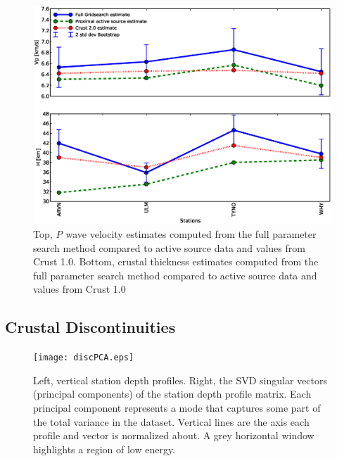 \documentclass[review]{elsarticle}
\begin{document}
\begin{figure}
  \centering
  \includegraphics[width=\textwidth]{vpactive.eps}
  \caption{Top, {\it P} wave velocity estimates computed from the full parameter search method compared to active source data and values from Crust 1.0. Bottom, crustal thickness estimates computed from the full parameter search method compared to active source data and values from Crust 1.0}
  \label{fig:vpactive}
\end{figure}



\subsection{Crustal Discontinuities} \label{section:discontinuities}

\begin{figure}
  \centering
  \texttt{[image: discPCA.eps]}
  \caption{Left, vertical station depth profiles. Right, the SVD singular vectors (principal components) of the station depth profile matrix. Each principal component represents a mode that captures some part of the total variance in the dataset. Vertical lines are the axis each profile and vector is normalized about. A grey horizontal window highlights a region of low energy.}
  \label{fig:discPCA}
\end{figure}
\end{document}

